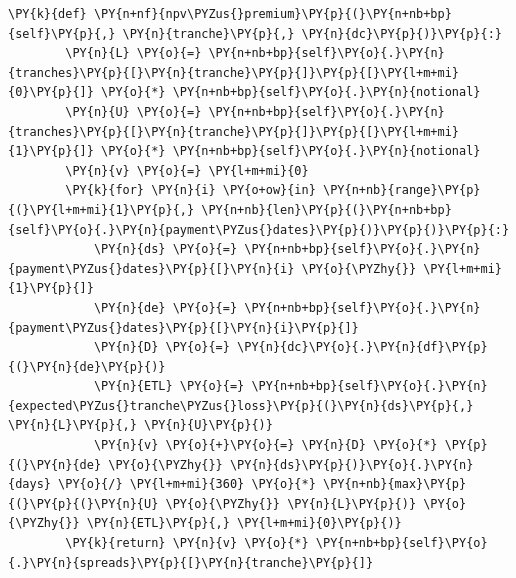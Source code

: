\begin{tcolorbox}[breakable, size=fbox, boxrule=1pt, pad at break*=1mm,colback=cellbackground, colframe=cellborder]
\begin{Verbatim}[commandchars=\\\{\}]
    \PY{k}{def} \PY{n+nf}{npv\PYZus{}premium}\PY{p}{(}\PY{n+nb+bp}{self}\PY{p}{,} \PY{n}{tranche}\PY{p}{,} \PY{n}{dc}\PY{p}{)}\PY{p}{:}
        \PY{n}{L} \PY{o}{=} \PY{n+nb+bp}{self}\PY{o}{.}\PY{n}{tranches}\PY{p}{[}\PY{n}{tranche}\PY{p}{]}\PY{p}{[}\PY{l+m+mi}{0}\PY{p}{]} \PY{o}{*} \PY{n+nb+bp}{self}\PY{o}{.}\PY{n}{notional}
        \PY{n}{U} \PY{o}{=} \PY{n+nb+bp}{self}\PY{o}{.}\PY{n}{tranches}\PY{p}{[}\PY{n}{tranche}\PY{p}{]}\PY{p}{[}\PY{l+m+mi}{1}\PY{p}{]} \PY{o}{*} \PY{n+nb+bp}{self}\PY{o}{.}\PY{n}{notional}
        \PY{n}{v} \PY{o}{=} \PY{l+m+mi}{0}
        \PY{k}{for} \PY{n}{i} \PY{o+ow}{in} \PY{n+nb}{range}\PY{p}{(}\PY{l+m+mi}{1}\PY{p}{,} \PY{n+nb}{len}\PY{p}{(}\PY{n+nb+bp}{self}\PY{o}{.}\PY{n}{payment\PYZus{}dates}\PY{p}{)}\PY{p}{)}\PY{p}{:}
            \PY{n}{ds} \PY{o}{=} \PY{n+nb+bp}{self}\PY{o}{.}\PY{n}{payment\PYZus{}dates}\PY{p}{[}\PY{n}{i} \PY{o}{\PYZhy{}} \PY{l+m+mi}{1}\PY{p}{]}
            \PY{n}{de} \PY{o}{=} \PY{n+nb+bp}{self}\PY{o}{.}\PY{n}{payment\PYZus{}dates}\PY{p}{[}\PY{n}{i}\PY{p}{]}
            \PY{n}{D} \PY{o}{=} \PY{n}{dc}\PY{o}{.}\PY{n}{df}\PY{p}{(}\PY{n}{de}\PY{p}{)}
            \PY{n}{ETL} \PY{o}{=} \PY{n+nb+bp}{self}\PY{o}{.}\PY{n}{expected\PYZus{}tranche\PYZus{}loss}\PY{p}{(}\PY{n}{ds}\PY{p}{,} \PY{n}{L}\PY{p}{,} \PY{n}{U}\PY{p}{)}
            \PY{n}{v} \PY{o}{+}\PY{o}{=} \PY{n}{D} \PY{o}{*} \PY{p}{(}\PY{n}{de} \PY{o}{\PYZhy{}} \PY{n}{ds}\PY{p}{)}\PY{o}{.}\PY{n}{days} \PY{o}{/} \PY{l+m+mi}{360} \PY{o}{*} \PY{n+nb}{max}\PY{p}{(}\PY{p}{(}\PY{n}{U} \PY{o}{\PYZhy{}} \PY{n}{L}\PY{p}{)} \PY{o}{\PYZhy{}} \PY{n}{ETL}\PY{p}{,} \PY{l+m+mi}{0}\PY{p}{)}
        \PY{k}{return} \PY{n}{v} \PY{o}{*} \PY{n+nb+bp}{self}\PY{o}{.}\PY{n}{spreads}\PY{p}{[}\PY{n}{tranche}\PY{p}{]}
		

\end{Verbatim}
\end{tcolorbox}
